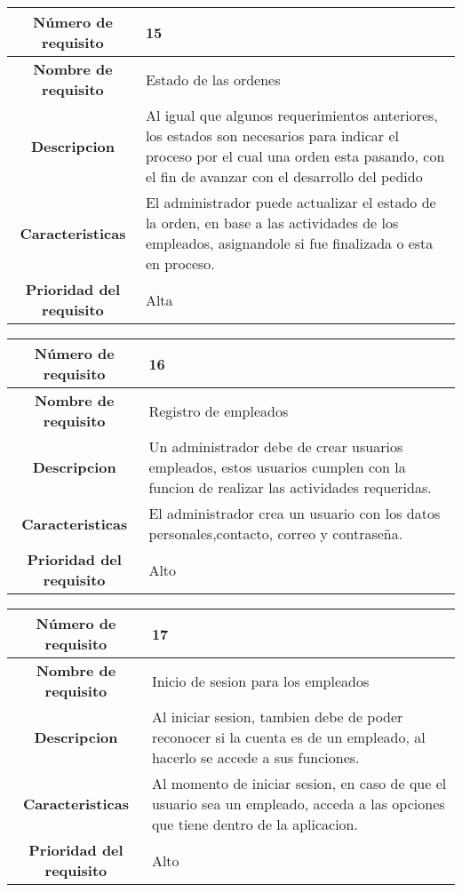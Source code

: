 \documentclass[12pt,a4paper, twosite]{article}
\begin{document}
\begin{center}
    \begin{tabular}{|c|p{6cm}|}
        \hline
        \textbf{Número de requisito} & 15 \\ 
        \hline
        \textbf{Nombre de requisito} & Estado de las ordenes \\
        \hline
        \textbf{Descripcion} & Al igual que algunos requerimientos anteriores, los estados son necesarios para indicar el proceso por el cual una orden esta pasando, con el fin de avanzar con el desarrollo del pedido \\
        \hline
        \textbf{Caracteristicas} & El administrador puede actualizar el estado de la orden, en base a las actividades de los empleados, asignandole si fue finalizada o esta en proceso. \\
        \hline
        \textbf{Prioridad del requisito} & Alta \\
        \hline
     \end{tabular}
\end{center}

\begin{center}
    \begin{tabular}{|c|p{6cm}|}
        \hline
        \textbf{Número de requisito} & 16 \\ 
        \hline
        \textbf{Nombre de requisito} & Registro de empleados \\
        \hline
        \textbf{Descripcion} & Un administrador debe de crear usuarios empleados, estos usuarios cumplen con la funcion de realizar las actividades requeridas. \\
        \hline
        \textbf{Caracteristicas} & El administrador crea un usuario con los datos personales,contacto, correo y contraseña. \\
        \hline
        \textbf{Prioridad del requisito} & Alto \\
        \hline
     \end{tabular}
\end{center}
\begin{center}
    \begin{tabular}{|c|p{6cm}|}
        \hline
        \textbf{Número de requisito} & 17 \\ 
        \hline
        \textbf{Nombre de requisito} &  Inicio de sesion para los empleados\\
        \hline
        \textbf{Descripcion} & Al iniciar sesion, tambien debe de poder reconocer si la cuenta es de un empleado, al hacerlo se accede a sus funciones.\\
        \hline
        \textbf{Caracteristicas} & Al momento de iniciar sesion, en caso de que el usuario sea un empleado, acceda a las opciones que tiene dentro de la aplicacion. \\
        \hline
        \textbf{Prioridad del requisito} & Alto \\
        \hline
     \end{tabular}
\end{center}
\end{document}
